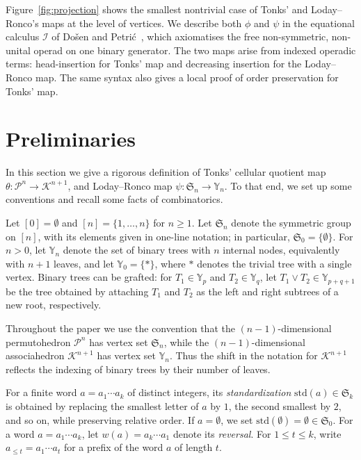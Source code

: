 \documentclass[a4paper]{article}
\theoremstyle{plain}
\theoremstyle{definition}
\theoremstyle{remark}
\numberwithin{equation}{section}
\renewcommand{\leq}{\leqslant}\renewcommand{\geq}{\geqslant}
\newcommand{\Sym}{\mathfrak{S}}
\newcommand{\Y}{\mathbb{Y}}
\newcommand{\Prm}{\mathcal{P}}
\newcommand{\Asc}{\mathcal{K}}
\newcommand{\std}{\mathrm{std}}
\begin{document}
Figure~\ref{fig:projection} shows the smallest nontrivial case of Tonks' and Loday--Ronco's maps at the level of vertices. We describe both \(\phi\) and \(\psi\) in
the equational calculus \(\mathcal I\) of Do\v{s}en and Petri\'c~\cite{DP1},
which axiomatises the free non-symmetric, non-unital operad on one binary
generator. The two maps arise from indexed operadic terms:
head-insertion for Tonks' map and decreasing insertion for the Loday--Ronco
map. The same syntax also gives a local proof of order preservation for
Tonks' map.

\section{Preliminaries}

In this section we give a rigorous definition of Tonks' cellular quotient map $\theta:\Prm^n\longrightarrow \Asc^{n+1}$, and Loday--Ronco map $\psi:\Sym_n\longrightarrow \Y_n$. To that end, we set up some conventions and recall some facts of combinatorics.

Let $[0]=\emptyset$ and $[n]=\{1,\dots,n\}$ for $n\ge 1$. 
Let $\Sym_n$ denote the symmetric group on $[n]$, with its elements given in one-line notation; in
particular, $\Sym_0=\{\emptyset\}$. 
For $n>0$, let $\Y_n$ denote the set of binary trees with $n$ internal nodes, equivalently
with $n+1$ leaves, and let \(\Y_0=\{\ast\}\), where \(\ast\) denotes the
trivial tree with a single vertex.
Binary trees can be grafted: for \(T_1\in\Y_p\) and \(T_2\in\Y_q\), let  \(T_1\vee T_2\in\Y_{p+q+1}\) be the tree obtained by attaching \(T_1\) and \(T_2\) as the left and right subtrees of a new root, respectively.

Throughout the paper we use the convention that the $(n-1)$-dimensional
permutohedron \(\Prm^n\) has vertex set \(\Sym_n\), while the
\((n-1)\)-dimensional associahedron \(\Asc^{n+1}\) has vertex set \(\Y_n\).
Thus the shift in the notation for \(\Asc^{n+1}\) reflects the indexing of
binary trees by their number of leaves.

For a finite word \(a=a_1\cdots a_k\) of distinct integers, its \emph{standardization}
\(\std(a)\in\Sym_k\) is obtained by replacing the smallest letter of \(a\) by \(1\), the
second smallest by \(2\), and so on, while preserving relative order. If \(a=\emptyset\), we set \(\std(\emptyset)=\emptyset\in\Sym_0\). For a word \(a=a_1\cdots a_k\), let \(w(a)=a_k\cdots a_1\) denote its \emph{reversal}. For \(1\leq t\leq k\), write \(a_{\leq t}=a_1\cdots a_t\) for a prefix of the word \(a\) of length \(t\).
\end{document}
